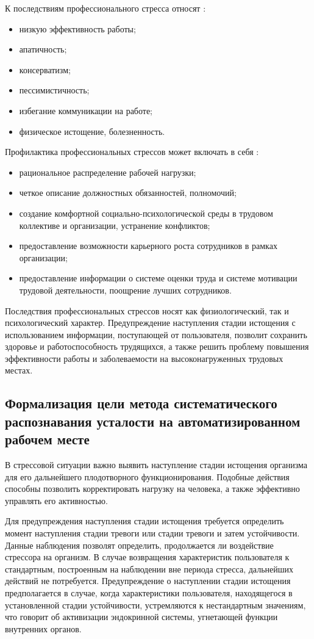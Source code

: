 К последствиям профессионального стресса относят \cite{professionalStress}:
\begin{itemize}[leftmargin=1.6\parindent]
\item низкую эффективность работы;
\item апатичность;
\item консерватизм;
\item пессимистичность;
\item избегание коммуникации на работе;
\item физическое истощение, болезненность.
\end{itemize}

Профилактика профессиональных стрессов может включать в себя \cite{professionalStress}:
\begin{itemize}[leftmargin=1.6\parindent]
\item рациональное распределение рабочей нагрузки;
\item четкое описание должностных обязанностей, полномочий;
\item создание комфортной социально-психологической среды в трудовом коллективе и организации, устранение конфликтов;
\item предоставление возможности карьерного роста сотрудников в рамках организации;
\item предоставление информации о системе оценки труда и системе мотивации трудовой деятельности, поощрение лучших сотрудников.
\end{itemize}

Последствия профессиональных стрессов носят как физиологический, так и психологический характер. Предупреждение наступления стадии истощения с использованием информации, поступающей от пользователя, позволит сохранить здоровье и работоспособность трудящихся, а также решить проблему повышения эффективности работы и заболеваемости на высоконагруженных трудовых местах.

\subsection{Формализация цели метода систематического распознавания ус\-талости на автоматизированном рабочем месте}
В стрессовой ситуации важно выявить наступление стадии истощения организма для его дальнейшего плодотворного функционирования. Подобные действия способны позволить корректировать нагрузку на человека, а также эффективно управлять его активностью.

Для предупреждения наступления стадии истощения требуется определить момент наступления стадии тревоги или стадии тревоги и затем устойчивости. Данные наблюдения позволят определить, продолжается ли воздействие стрессора на организм. В случае возвращения характеристик пользователя к стандартным, построенным на наблюдении вне периода стресса, дальнейших действий не потребуется. Предупреждение о наступлении стадии истощения предполагается в случае, когда характеристики пользователя, находящегося в установленной стадии устойчивости, устремляются к нестандартным значениям, что говорит об активизации эндокринной системы, угнетающей функции внутренних органов.

